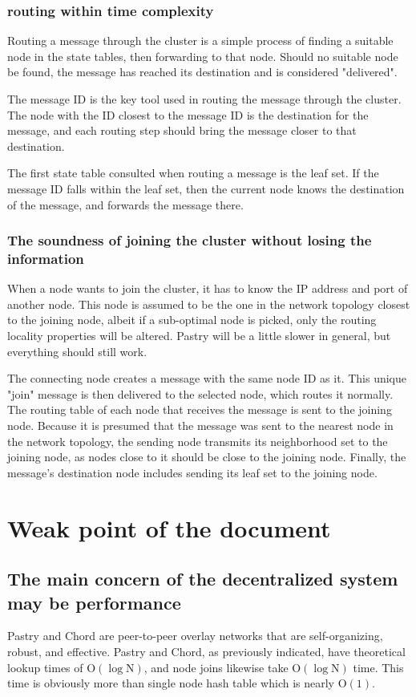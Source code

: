 \documentclass[acmlarge]{acmart}
\begin{document}
\subsubsection{routing within time complexity}
Routing a message through the cluster is a simple process of finding a suitable node in the state tables, then forwarding to that node. Should no suitable node be found, the message has reached its destination and is considered "delivered".

The message ID is the key tool used in routing the message through the cluster. The node with the ID closest to the message ID is the destination for the message, and each routing step should bring the message closer to that destination.

The first state table consulted when routing a message is the leaf set. If the message ID falls within the leaf set, then the current node knows the destination of the message, and forwards the message there.
\subsubsection{The soundness of joining the cluster without losing the information}
When a node wants to join the cluster, it has to know the IP address and port of another node. This node is assumed to be the one in the network topology closest to the joining node, albeit if a sub-optimal node is picked, only the routing locality properties will be altered. Pastry will be a little slower in general, but everything should still work.

The connecting node creates a message with the same node ID as it. This unique "join" message is then delivered to the selected node, which routes it normally. The routing table of each node that receives the message is sent to the joining node. Because it is presumed that the message was sent to the nearest node in the network topology, the sending node transmits its neighborhood set to the joining node, as nodes close to it should be close to the joining node. Finally, the message's destination node includes sending its leaf set to the joining node.

\section{Weak point of the document}
\subsection{The main concern of the decentralized system may be performance}
Pastry and Chord are peer-to-peer overlay networks that are self-organizing, robust, and effective. Pastry and Chord, as previously indicated, have theoretical lookup times of $\mathrm{O}(\log \mathrm{N})$, and node joins likewise take $\mathrm{O}(\log \mathrm{N})$ time. This time is obviously more than single node hash table which is nearly $\mathrm{O}(1)$.
\end{document}
